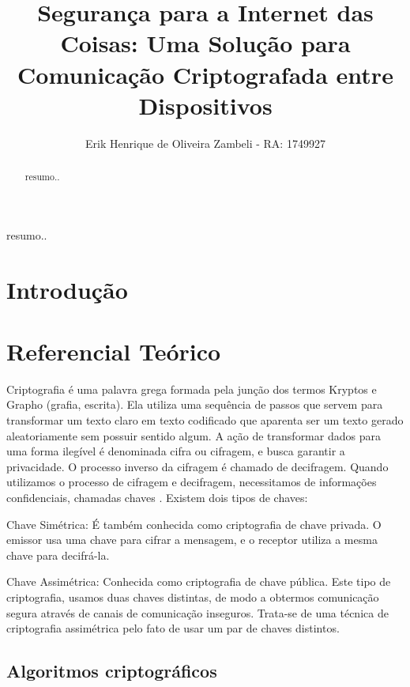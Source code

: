 \documentclass[12pt]{article}
\title{Segurança para a Internet das Coisas: Uma Solução para Comunicação Criptografada entre Dispositivos}
\author{Erik Henrique de Oliveira Zambeli - RA: 1749927}
\begin{document}
 

\maketitle

\begin{abstract}
  resumo..
\end{abstract}
     
\begin{resumo} 
  resumo..
\end{resumo}


\section{Introdução}


\section{Referencial Teórico}

Criptografia é uma palavra grega formada pela junção dos termos Kryptos e Grapho (grafia, escrita). Ela utiliza uma sequência de passos que servem para transformar um texto claro em texto codificado que aparenta ser um texto gerado aleatoriamente sem possuir sentido algum. A ação de transformar dados para uma forma ilegível é denominada cifra ou cifragem, e busca garantir  a  privacidade. O processo inverso da cifragem é chamado de decifragem. Quando utilizamos o processo de cifragem e decifragem, necessitamos de informações confidenciais, chamadas chaves \cite{STALLINGS:14}. Existem dois tipos de chaves:

Chave Simétrica: É também conhecida como criptografia de chave privada. O emissor usa uma chave para cifrar a mensagem, e o receptor utiliza a mesma chave para decifrá-la. 

Chave Assimétrica: Conhecida como  criptografia de  chave  pública. Este tipo de  criptografia,  usamos  duas  chaves  distintas,  de  modo  a  obtermos  comunicação  segura através de canais de comunicação inseguros. Trata-se de uma técnica de criptografia assimétrica pelo fato de usar um par de chaves distintos.

\subsection{Algoritmos criptográficos}
\end{document}
